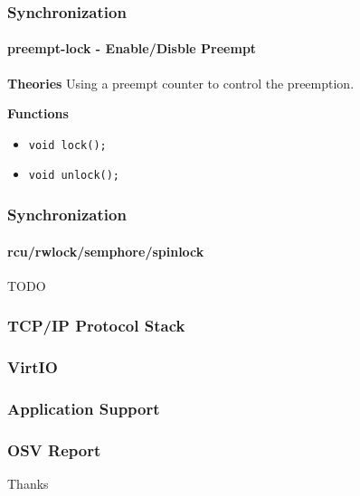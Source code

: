 \documentclass[10pt]{beamer}
\begin{document}
\begin{frame}
	\frametitle{Synchronization}
	\framesubtitle{preempt-lock - Enable/Disble Preempt}

	\textbf{Theories}
	Using a preempt counter to control the preemption.
	
	\smallskip

	\textbf{Functions}
	\begin{itemize}
		\item \texttt{void lock();}
		\item \texttt{void unlock();}
	\end{itemize}
	
\end{frame}


\begin{frame}
	\frametitle{Synchronization}
	\framesubtitle{rcu/rwlock/semphore/spinlock}

	\center
	TODO
	
\end{frame}

\begin{frame}
	\frametitle{TCP/IP Protocol Stack}

\end{frame}

\begin{frame}
	\frametitle{VirtIO}

\end{frame}


\begin{frame}
	\frametitle{Application Support}
	
	

\end{frame}



\begin{frame}
	\frametitle{OSV Report}

\center
Thanks

\end{frame}
\end{document}
